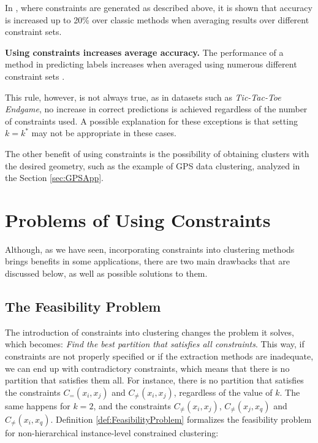In \cite{wagstaff2000clustering}, where constraints are generated as described above, it is shown that accuracy is increased up to 20\% over classic methods when averaging results over different constraint sets.

\begin{observation}
	
	\textbf{Using constraints increases average accuracy.}
	The performance of a method in predicting labels increases when averaged using numerous different constraint sets \cite{davidson2007survey}.
	\label{ob:AccuracyIncrease}
	
\end{observation}

This rule, however, is not always true, as in datasets such as \textit{Tic-Tac-Toe Endgame}, no increase in correct predictions is achieved regardless of the number of constraints used. A possible explanation for these exceptions is that setting $k = k^*$ may not be appropriate in these cases.

The other benefit of using constraints is the possibility of obtaining clusters with the desired geometry, such as the example of \acs{GPS} data clustering, analyzed in the Section \ref{sec:GPSApp}.

\section{Problems of Using Constraints} \label{sec:ConstraintsProblems}

Although, as we have seen, incorporating constraints into clustering methods brings benefits in some applications, there are two main drawbacks that are discussed below, as well as possible solutions to them.

\subsection{The Feasibility Problem} \label{sec:FeasibilityProblem}

The introduction of constraints into clustering changes the problem it solves, which becomes: \textit{Find the best partition that satisfies all constraints}. This way, if constraints are not properly specified or if the extraction methods are inadequate, we can end up with contradictory constraints, which means that there is no partition that satisfies them all. For instance, there is no partition that satisfies the constraints $C_=(x_i,x_j)$ and $C_{\neq}(x_i,x_j)$, regardless of the value of $k$. The same happens for $k = 2$, and the constraints $C_{\neq}(x_i, x_j)$, $C_{\neq}(x_j, x_q)$ and $C_{\neq}(x_i, x_q)$. Definition \ref{def:FeasibilityProblem} formalizes the feasibility problem for non-hierarchical instance-level constrained clustering:

